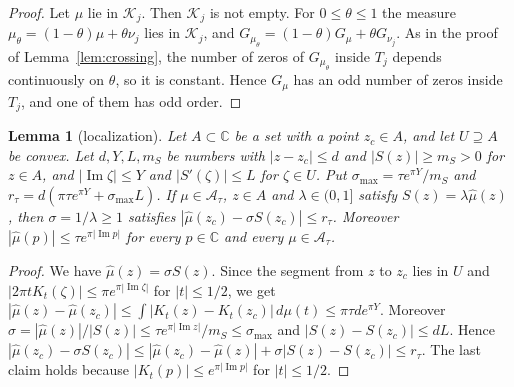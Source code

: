 \documentclass[11pt]{amsart}
\newtheorem{lemma}[theorem]{Lemma}
\theoremstyle{definition}
\theoremstyle{remark}
\numberwithin{equation}{section}
\newcommand{\C}{\mathbb{C}}
\newcommand{\im}{\operatorname{Im}}
\begin{document}
\begin{proof}
Let $\mu$ lie in $\mathcal K_j$. Then $\mathcal K_j$ is not empty. For $0\le\theta\le1$ the measure $\mu_\theta=(1-\theta)\mu+\theta\nu_j$ lies in $\mathcal K_j$, and $G_{\mu_\theta}=(1-\theta)G_\mu+\theta G_{\nu_j}$. As in the proof of Lemma~\ref{lem:crossing}, the number of zeros of $G_{\mu_\theta}$ inside $T_j$ depends continuously on $\theta$, so it is constant. Hence $G_\mu$ has an odd number of zeros inside $T_j$, and one of them has odd order.
\end{proof}

\begin{lemma}[localization]\label{lem:local}
Let $A\subset\C$ be a set with a point $z_c\in A$, and let $U\supseteq A$ be convex. Let $d,Y,L,m_S$ be numbers with $|z-z_c|\le d$ and $|S(z)|\ge m_S>0$ for $z\in A$, and $|\im\zeta|\le Y$ and $|S'(\zeta)|\le L$ for $\zeta\in U$. Put $\sigma_{\max}=\tau e^{\pi Y}/m_S$ and $r_\tau=d(\pi\tau e^{\pi Y}+\sigma_{\max}L)$. If $\mu\in\mathcal A_\tau$, $z\in A$ and $\lambda\in(0,1]$ satisfy $S(z)=\lambda\hat\mu(z)$, then $\sigma=1/\lambda\ge1$ satisfies $|\hat\mu(z_c)-\sigma S(z_c)|\le r_\tau$. Moreover $|\hat\mu(p)|\le\tau e^{\pi|\im p|}$ for every $p\in\C$ and every $\mu\in\mathcal A_\tau$.
\end{lemma}

\begin{proof}
We have $\hat\mu(z)=\sigma S(z)$. Since the segment from $z$ to $z_c$ lies in $U$ and $|2\pi tK_t(\zeta)|\le\pi e^{\pi|\im\zeta|}$ for $|t|\le1/2$, we get $|\hat\mu(z)-\hat\mu(z_c)|\le\int|K_t(z)-K_t(z_c)|\,d\mu(t)\le\pi\tau de^{\pi Y}$. Moreover $\sigma=|\hat\mu(z)|/|S(z)|\le\tau e^{\pi|\im z|}/m_S\le\sigma_{\max}$ and $|S(z)-S(z_c)|\le dL$. Hence $|\hat\mu(z_c)-\sigma S(z_c)|\le|\hat\mu(z_c)-\hat\mu(z)|+\sigma|S(z)-S(z_c)|\le r_\tau$. The last claim holds because $|K_t(p)|\le e^{\pi|\im p|}$ for $|t|\le1/2$.
\end{proof}
\end{document}
